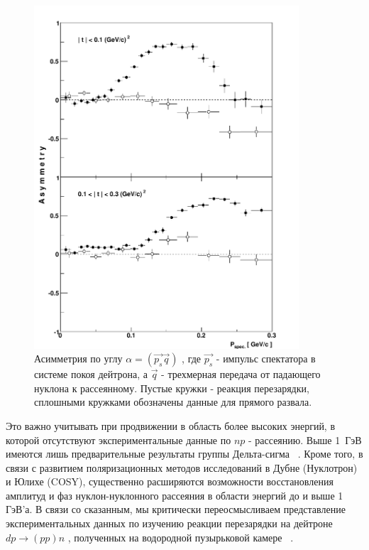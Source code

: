 \documentclass[a4paper,12pt]{article}
\begin{document}
\begin{figure}[!h]
  \centering
  \includegraphics[width=0.88\textwidth]{fig_asym.pdf}
  \caption {Асимметрия по углу $\alpha=(\vec{p_s}\vec{q})$ , где
    $\vec{p_s}$ - импульс спектатора в системе покоя дейтрона, а
    $\vec{q}$ - трехмерная передача от падающего нуклона к
    рассеянному. Пустые кружки - реакция перезарядки, сплошными
    кружками обозначены данные для прямого развала.}
  \label{f_asym}
\end{figure}

Это важно учитывать при продвижении в область более высоких энергий, в
которой отсутствуют экспериментальные данные по $np$ - рассеянию.
Выше 1~ГэВ имеются лишь предварительные результаты группы Дельта-сигма
~\cite{a5}. Кроме того, в связи с развитием поляризационных методов
исследований в Дубне (Нуклотрон) и Юлихе (COSY), существенно
расширяются возможности восстановления амплитуд и фаз
нуклон-нуклонного рассеяния в области энергий до и выше 1 ГэВ'а. В
связи со сказанным, мы критически переосмысливаем представление
экспериментальных данных по изучению реакции перезарядки на дейтроне
$dp\to(pp)n$ , полученных на водородной пузырьковой камере ~\cite{a6}.
\end{document}
